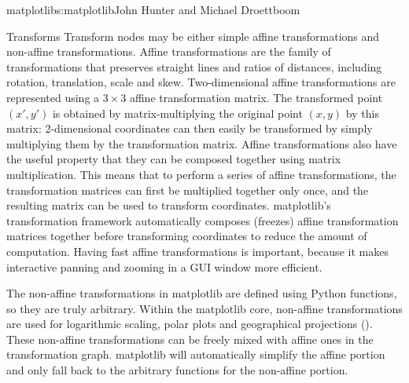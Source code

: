\begin{aosachapter}{matplotlib}{s:matplotlib}{John Hunter and Michael Droettboom}
\begin{aosasect1}{Transforms}
Transform nodes may be either simple affine transformations and
non-affine transformations.  Affine transformations are the family of
transformations that preserves straight lines and ratios of distances,
including rotation, translation, scale and skew.  Two-dimensional
affine transformations are represented using a $3 \times 3$ affine
transformation matrix.  The transformed point $(x\prime, y\prime)$ is
obtained by matrix-multiplying the original point $(x, y)$ by this
matrix:
2-dimensional coordinates can then easily be transformed by simply
multiplying them by the transformation matrix.  Affine transformations
also have the useful property that they can be composed together using
matrix multiplication.  This means that to perform a series of affine
transformations, the transformation matrices can first be multiplied
together only once, and the resulting matrix can be used to transform
coordinates.  matplotlib's transformation framework automatically
composes (freezes) affine transformation matrices together before
transforming coordinates to reduce the amount of computation.  Having
fast affine transformations is important, because it makes interactive
panning and zooming in a GUI window more efficient.

The non-affine transformations in matplotlib are defined using Python
functions, so they are truly arbitrary.  Within the matplotlib core,
non-affine transformations are used for logarithmic scaling, polar
plots and geographical projections ().  These non-affine transformations can
be freely mixed with affine ones in the transformation graph.
matplotlib will automatically simplify the affine portion and only
fall back to the arbitrary functions for the non-affine portion.


\end{aosasect1}
\end{aosachapter}
